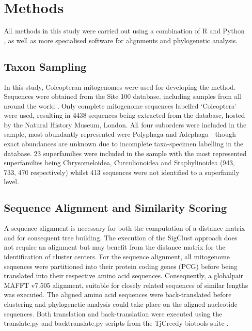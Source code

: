 \documentclass[12pt]{article}
\begin{document}
  \section{Methods}

  All methods in this study were carried out using a combination of R \cite{R} and Python \cite{python}, as well as more specialised software for alignments and phylogenetic analysis.

    \subsection{Taxon Sampling}

  In this study, Coleopteran mitogenomes were used for developing the method. Sequences were obtained from the Site 100 database, including samples from all around the world \cite{Site100}. Only complete mitogenome sequences labelled `Coleoptera’ were used, resulting in 4438 sequences being extracted from the database, hosted by the Natural History Museum, London. All four suborders were included in the sample, most abundantly represented were Polyphaga and Adephaga - though exact abundances are unknown due to incomplete taxa-specimen labelling in the database. 23 superfamilies were included in the sample with the most represented superfamilies being Chrysomeloidea, Curculionoidea and Staphylinoidea (943,  733, 470 respectively) whilst 413 sequences were not identified to a superfamily level.

    \subsection{Sequence Alignment and Similarity Scoring}

  A sequence alignment is necessary for both the computation of a distance matrix and for consequent tree building. The execution of the SigClust approach does not require an alignment but may benefit from the distance matrix for the identification of cluster centers. For the sequence alignment, all mitogenome sequences were partitioned into their protein coding genes (PCG) before being translated into their respective amino acid sequences. Consequently, a globalpair MAFFT v7.505 \cite{MAFFT} alignment, suitable for closely related sequences of similar lengths was executed. The aligned amino acid sequences were back-translated before clustering and phylogenetic analysis could take place on the aligned nucleotide sequences. Both translation and back-translation were executed using the translate.py and backtranslate.py scripts from the TjCreedy biotools suite \cite{Tjcreedy}. 
\end{document}

